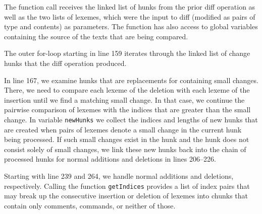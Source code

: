 The function call receives the linked list of hunks from the prior diff operation as well as the two lists of lexemes, which were the input to diff (modified as pairs of type and contents) as parameters.  The function has also access to global variables containing the source of the texts that are being compared.  

The outer for-loop starting in line 159 iterates through the linked list of change hunks that the diff operation produced.

In line 167, we examine hunks that are replacements for containing small changes.  There, we need to compare each lexeme of the deletion with each lexeme of the insertion until we find a matching small change.  In that case, we continue the pairwise comparison of lexemes with the indices that are greater than the small change.  In variable \texttt{newHunks} we collect the indices and lengths of new hunks that are created when pairs of lexemes denote a small change in the current hunk being processed.  If such small changes exist in the hunk and the hunk does not consist solely of small changes, we link these new hunks back into the chain of processed hunks for normal additions and deletions in lines 206--226.

Starting with line 239 and 264, we handle normal additions and deletions, respectively.  Calling the function \texttt{getIndices} provides a list of index pairs that may break up the consecutive insertion or deletion of lexemes into chunks that contain only comments, commands, or neither of those.


